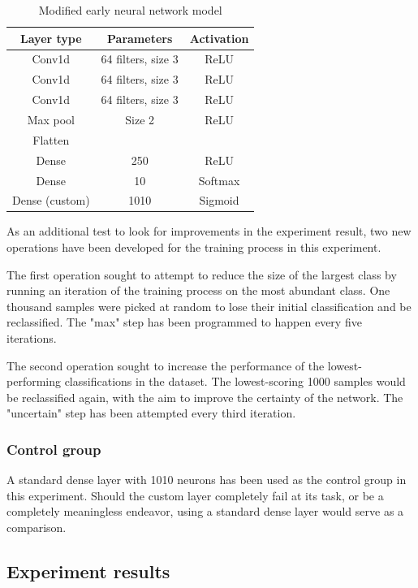 \begin{table}[ht]
    \centering
    \begin{tabular}{|c|c|c|}
        \hline
        Layer type & Parameters & Activation\\ \hline
        Conv1d & 64 filters, size 3 & ReLU\\ \hline
        Conv1d & 64 filters, size 3 & ReLU\\ \hline
        Conv1d & 64 filters, size 3 & ReLU\\ \hline
        Max pool & Size 2 & ReLU\\ \hline
        Flatten & &\\ \hline
        Dense & 250 & ReLU\\ \hline
        Dense & 10 & Softmax \\ \hline
        Dense (custom) & 1010 & Sigmoid \\ \hline
    \end{tabular}
    \caption{Modified early neural network model}
    \label{tab:earlymodelwithcustomlayer}
\end{table}

As an additional test to look for improvements in the experiment result, two new operations have been developed for the training process in this experiment.

The first operation sought to attempt to reduce the size of the largest class by running an iteration of the training process on the most abundant class.
One thousand samples were picked at random to lose their initial classification and be reclassified.
The "max" step has been programmed to happen every five iterations.

The second operation sought to increase the performance of the lowest-performing classifications in the dataset.
The lowest-scoring 1000 samples would be reclassified again, with the aim to improve the certainty of the network.
The "uncertain" step has been attempted every third iteration.

\subsubsection{Control group}

A standard dense layer with 1010 neurons has been used as the control group in this experiment.
Should the custom layer completely fail at its task, or be a completely meaningless endeavor, using a standard dense layer would serve as a comparison.


\subsection{Experiment results}

